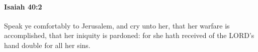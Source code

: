 
		\paragraph{Isaiah 40:2} %
			\label{ISAIAH-40-2}

			Speak ye comfortably to Jerusalem, and cry unto her, that her warfare is accomplished, that her iniquity is pardoned: for she hath received of the LORD's hand double for all her sins.


